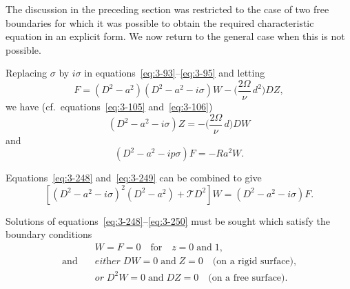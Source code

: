 The discussion in the preceding section was restricted to the case of two free boundaries for which it was possible to obtain the required characteristic equation in an explicit form. We now return to the general case when this is not possible.

Replacing $\sigma$ by $i\sigma$ in equations~\eqref{eq:3-93}--\eqref{eq:3-95} and letting
\begin{equation}\label{eq:3-248}
F = (D^2 - a^2)(D^2 - a^2 - i\sigma)W - \bigg(\frac{2\Omega}{\nu}\,d^2\bigg) DZ,
\end{equation}
we have (cf.\ equations~\eqref{eq:3-105} and~\eqref{eq:3-106})
\begin{equation}\label{eq:3-249}
(D^2 - a^2 - i\sigma)Z = -\bigg(\frac{2\Omega}{\nu}\,d\bigg) DW
\end{equation}
and
\begin{equation}\label{eq:3-250}
(D^2 - a^2 - ip\sigma)F = -Ra^2 W.
\end{equation}

Equations~\eqref{eq:3-248} and~\eqref{eq:3-249} can be combined to give
\begin{equation}\label{eq:3-251}
[(D^2 - a^2 - i\sigma)^2(D^2 - a^2) + \mathscr{T} D^2] W = (D^2 - a^2 - i\sigma)F.
\end{equation}

Solutions of equations~\eqref{eq:3-248}--\eqref{eq:3-250} must be sought which satisfy the boundary conditions
\begin{equation}\label{eq:3-252}
\begin{aligned}
&W = F = 0 \quad \text{for} \quad z = 0 \;\text{and}\; 1, \\
\text{and}\quad &\textit{either}\; DW = 0 \;\text{and}\; Z = 0 \quad \text{(on a rigid surface),} \\
&\textit{or}\; D^2 W = 0 \;\text{and}\; DZ = 0 \quad \text{(on a free surface).}
\end{aligned}
\end{equation}

